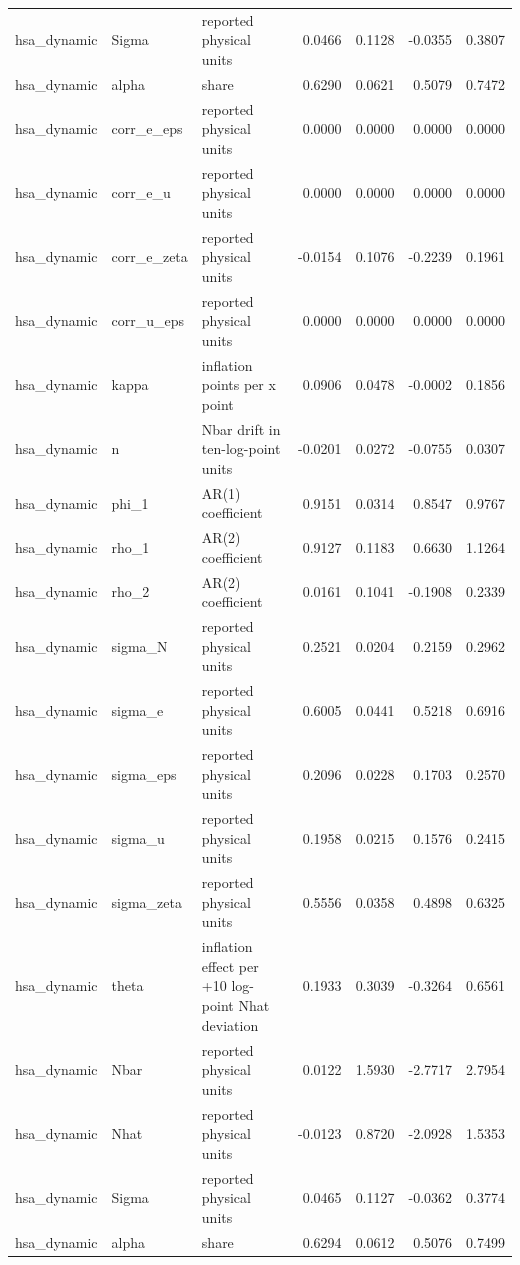 \begin{tabular}{lllrrrr}
hsa\_dynamic & Sigma & reported physical units & 0.0466 & 0.1128 & -0.0355 & 0.3807 \\
hsa\_dynamic & alpha & share & 0.6290 & 0.0621 & 0.5079 & 0.7472 \\
hsa\_dynamic & corr\_e\_eps & reported physical units & 0.0000 & 0.0000 & 0.0000 & 0.0000 \\
hsa\_dynamic & corr\_e\_u & reported physical units & 0.0000 & 0.0000 & 0.0000 & 0.0000 \\
hsa\_dynamic & corr\_e\_zeta & reported physical units & -0.0154 & 0.1076 & -0.2239 & 0.1961 \\
hsa\_dynamic & corr\_u\_eps & reported physical units & 0.0000 & 0.0000 & 0.0000 & 0.0000 \\
hsa\_dynamic & kappa & inflation points per x point & 0.0906 & 0.0478 & -0.0002 & 0.1856 \\
hsa\_dynamic & n & Nbar drift in ten-log-point units & -0.0201 & 0.0272 & -0.0755 & 0.0307 \\
hsa\_dynamic & phi\_1 & AR(1) coefficient & 0.9151 & 0.0314 & 0.8547 & 0.9767 \\
hsa\_dynamic & rho\_1 & AR(2) coefficient & 0.9127 & 0.1183 & 0.6630 & 1.1264 \\
hsa\_dynamic & rho\_2 & AR(2) coefficient & 0.0161 & 0.1041 & -0.1908 & 0.2339 \\
hsa\_dynamic & sigma\_N & reported physical units & 0.2521 & 0.0204 & 0.2159 & 0.2962 \\
hsa\_dynamic & sigma\_e & reported physical units & 0.6005 & 0.0441 & 0.5218 & 0.6916 \\
hsa\_dynamic & sigma\_eps & reported physical units & 0.2096 & 0.0228 & 0.1703 & 0.2570 \\
hsa\_dynamic & sigma\_u & reported physical units & 0.1958 & 0.0215 & 0.1576 & 0.2415 \\
hsa\_dynamic & sigma\_zeta & reported physical units & 0.5556 & 0.0358 & 0.4898 & 0.6325 \\
hsa\_dynamic & theta & inflation effect per +10 log-point Nhat deviation & 0.1933 & 0.3039 & -0.3264 & 0.6561 \\
hsa\_dynamic & Nbar & reported physical units & 0.0122 & 1.5930 & -2.7717 & 2.7954 \\
hsa\_dynamic & Nhat & reported physical units & -0.0123 & 0.8720 & -2.0928 & 1.5353 \\
hsa\_dynamic & Sigma & reported physical units & 0.0465 & 0.1127 & -0.0362 & 0.3774 \\
hsa\_dynamic & alpha & share & 0.6294 & 0.0612 & 0.5076 & 0.7499 \\

\end{tabular}
